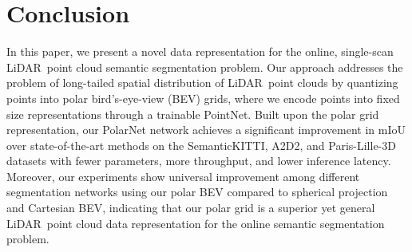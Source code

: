 \documentclass[10pt,twocolumn,letterpaper]{article}
\newcommand{\lidar}{\mbox{LiDAR }}
\begin{document}
\section{Conclusion}

In this paper, we present a novel data representation for the online, single-scan \lidar point cloud semantic segmentation problem. Our approach addresses the problem of long-tailed spatial distribution of \lidar point clouds by quantizing points into polar bird's-eye-view (BEV) grids, where we encode points into fixed size representations through a trainable PointNet. Built upon the polar grid representation, our PolarNet network achieves a significant improvement in mIoU over state-of-the-art methods on the SemanticKITTI, A2D2, and Paris-Lille-3D datasets with fewer parameters, more throughput, and lower inference latency. Moreover, our experiments show universal improvement among different segmentation networks using our polar BEV compared to spherical projection and Cartesian BEV, indicating that our polar grid is a superior yet general \lidar point cloud data representation for the online semantic segmentation problem.

\clearpage
{\small


}
\end{document}
